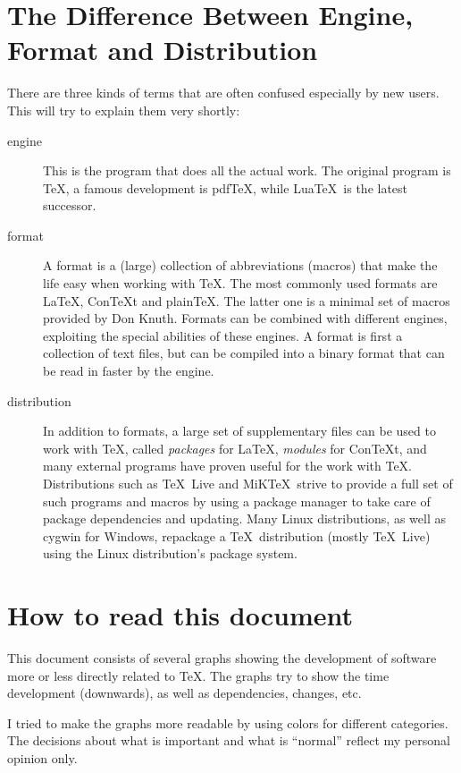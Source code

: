 \setlength{\columnsep}{1.5cm}
\newpage
\tableofcontents

\restoregeometry

\section{The Difference Between Engine, Format and Distribution}
There are three kinds of terms that are often confused especially by new users. This will try to explain them very shortly:
\begin{description}
\item[engine] This is the program that does all the actual work. The original program is \TeX, a famous development is pdf\TeX, while Lua\TeX\ is the latest successor.
\item[format] A format is a (large) collection of abbreviations (macros) that make the life easy when working with \TeX. The most commonly used formats are \LaTeX, Con\TeX t and plain\TeX. The latter one is a minimal set of macros provided by Don Knuth. Formats can be combined with different engines, exploiting the special abilities of these engines. A format is first a collection of text files, but can be compiled into a binary format that can be read in faster by the engine.
\item[distribution] In addition to formats, a large set of supplementary files can be used to work with \TeX, called \emph{packages} for \LaTeX, \emph{modules} for Con\TeX t, and many external programs have proven useful for the work with \TeX. Distributions such as \TeX~Live and MiK\TeX\ strive to provide a full set of such programs and macros by using a package manager to take care of package dependencies and updating. Many Linux distributions, as well as cygwin for Windows, repackage a \TeX\ distribution (mostly \TeX~Live) using the Linux distribution's package system.
\end{description}

\newpage
\section{How to read this document}
This document consists of several graphs showing the development of software more or less directly related to \TeX. The graphs try to show the time  development (downwards), as well as dependencies, changes, etc.

I tried to make the graphs more readable by using colors for different categories. The decisions about what is important and what is “normal” reflect my personal opinion only.


